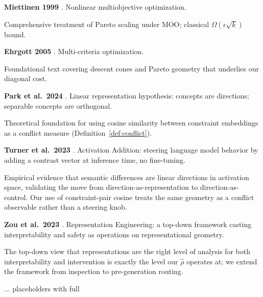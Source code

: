 \hypertarget{rw:miettinen}{}\textbf{Miettinen 1999} \citep{miettinen1999nonlinear}.
Nonlinear multiobjective optimization.

Comprehensive treatment of Pareto scaling under MOO; classical
$\Omega(\epsilon\sqrt{k})$ bound.

\hypertarget{rw:ehrgott}{}\textbf{Ehrgott 2005} \citep{ehrgott2005multicriteria}.
Multi-criteria optimization.

Foundational text covering descent cones and Pareto geometry that
underlies our diagonal cost.

\hypertarget{rw:park}{}\textbf{Park et al.\ 2024} \citep{park2023linear}.
Linear representation hypothesis: concepts are directions; separable concepts
are orthogonal.

Theoretical foundation for using cosine similarity between constraint
embeddings as a conflict measure (Definition~\ref{def:conflict}).

\hypertarget{rw:turner}{}\textbf{Turner et al.\ 2023} \citep{turner2023activation}.
Activation Addition: steering language model behavior by adding a contrast
vector at inference time, no fine-tuning.

Empirical evidence that semantic differences are linear directions in
activation space, validating the move from direction-as-representation to
direction-as-control. Our use of constraint-pair cosine treats the same
geometry as a conflict observable rather than a steering knob.

\hypertarget{rw:zou}{}\textbf{Zou et al.\ 2023} \citep{zou2023representation}.
Representation Engineering: a top-down framework casting interpretability and
safety as operations on representational geometry.

The top-down view that representations are the right level of analysis
for both interpretability and intervention is exactly the level our $\hat{\rho}$
operates at; we extend the framework from inspection to pre-generation routing.

... placeholders with full
